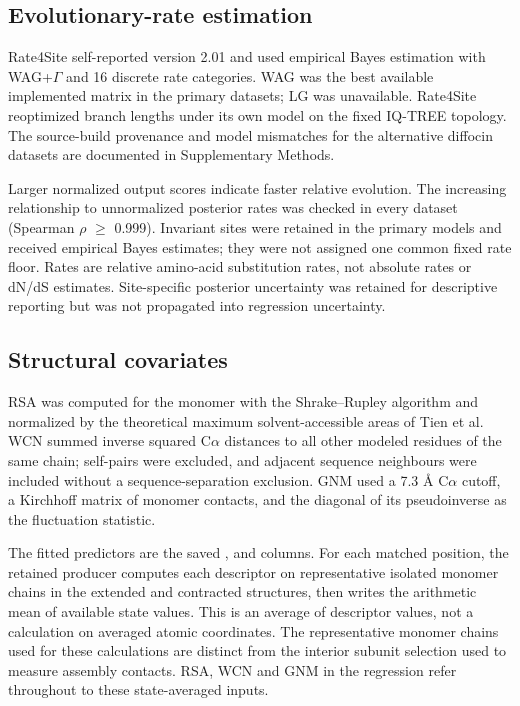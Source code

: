 \documentclass[11pt,a4paper]{article}
\begin{document}
\subsection{Evolutionary-rate estimation}

Rate4Site self-reported version 2.01 and used empirical Bayes estimation with WAG+\ensuremath{\Gamma} and 16 discrete rate categories.\cite{ref8,ref9,ref18} WAG was the best available implemented matrix in the primary datasets; LG was unavailable. Rate4Site reoptimized branch lengths under its own model on the fixed IQ-TREE topology. The source-build provenance and model mismatches for the alternative diffocin datasets are documented in Supplementary Methods.

Larger normalized output scores indicate faster relative evolution. The increasing relationship to unnormalized posterior rates was checked in every dataset (Spearman \ensuremath{\rho} \ensuremath{\geq} 0.999). Invariant sites were retained in the primary models and received empirical Bayes estimates; they were not assigned one common fixed rate floor. Rates are relative amino-acid substitution rates, not absolute rates or dN/dS estimates. Site-specific posterior uncertainty was retained for descriptive reporting but was not propagated into regression uncertainty.

\subsection{Structural covariates}

RSA was computed for the monomer with the Shrake--Rupley algorithm\cite{ref19} and normalized by the theoretical maximum solvent-accessible areas of Tien et al.\cite{ref20} WCN summed inverse squared C\ensuremath{\alpha} distances to all other modeled residues of the same chain; self-pairs were excluded, and adjacent sequence neighbours were included without a sequence-separation exclusion.\cite{ref6} GNM used a 7.3 \AA{} C\ensuremath{\alpha} cutoff, a Kirchhoff matrix of monomer contacts, and the diagonal of its pseudoinverse as the fluctuation statistic.\cite{ref21}

The fitted predictors are the saved ,  and  columns. For each matched position, the retained producer computes each descriptor on representative isolated monomer chains in the extended and contracted structures, then writes the arithmetic mean of available state values. This is an average of descriptor values, not a calculation on averaged atomic coordinates. The representative monomer chains used for these calculations are distinct from the interior subunit selection used to measure assembly contacts. RSA, WCN and GNM in the regression refer throughout to these state-averaged inputs.
\end{document}

